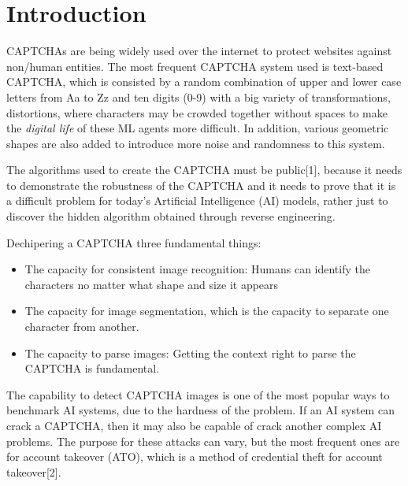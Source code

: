 \documentclass[conference]{IEEEtran}
\begin{document}
\section{Introduction}
\par CAPTCHAs are being widely used over the internet to protect websites against non/human entities. The most frequent CAPTCHA system used is text-based CAPTCHA, which is consisted by a random combination of upper and lower case letters from Aa to Zz and ten digits (0-9) with a big variety of transformations, distortions, where characters may be crowded together without spaces to make the \textit{digital life} of these ML agents more difficult. In addition, various geometric shapes are also added to introduce more noise and randomness to this system.
\par The algorithms used to create the CAPTCHA must be public[1], because it needs to demonstrate the robustness of the CAPTCHA and it needs to prove that it is a difficult problem for today's Artificial Intelligence (AI) models, rather just to discover the hidden algorithm obtained through reverse engineering.
\par Dechipering a CAPTCHA three fundamental things: 
\begin{itemize}
\item The capacity for consistent image recognition: Humans can identify the characters no matter what shape and size it appears
\item The capacity for image segmentation, which is the capacity to separate one character from another.
\item The capacity to parse images: Getting the context right to parse the CAPTCHA is fundamental.
\end{itemize}
\par The capability to detect CAPTCHA images is one of the most popular ways to benchmark AI systems, due to the hardness of the problem. If an AI system can crack a CAPTCHA, then it may also be capable of crack another complex AI problems. The purpose for these attacks can vary, but the most frequent ones are for account takeover (ATO), which is a method of credential theft for account takeover[2].
\end{document}
